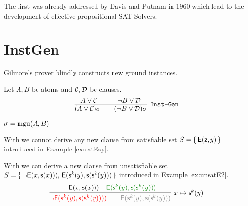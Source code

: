 The first was already addressed by Davis and Putnam in 1960 \cite{Davis:1960:CPQ:321033.321034}
which lead to the development of effective propositional SAT Solvers.

\section{InstGen}

Gilmore's prover blindly constructs new ground instances. 

\begin{definition}[\InstGen] Let $A, B$ be atoms and ${\mathcal C},{\mathcal D}$ be clauses.
	\begin{gather*}
	\infer
	[{\InstGen}] 
	{(A\lor\mathcal C)\sigma\qquad (\lnot B\lor\mathcal D)\sigma}
	{A\lor\mathcal C\quad&\quad \lnot B\lor\mathcal D}
	\end{gather*}
	\begin{center}$\sigma=\operatorname{mgu}(A,B)$
	\end{center}
\end{definition}

\begin{example}
	With \InstGen we cannot derive any new clause from satisfiable set 
	$S = \{\,{\mathsf{E}}({\mathsf z},y)\,\}$ 
	introduced in Example \ref{ex:satEzy}.
\end{example}

\begin{example}
	With \InstGen we can derive a new clause from unsatisfiable set
$S =
\{\,
{ \lnot{\mathsf{E}}(x, {\mathsf s}(x)))},\, 
{ {\mathsf{E}}({\mathsf s}^k(y), {\mathsf s}({\mathsf s}^k(y)))}
\,\}$ 
 introduced in Example \ref{ex:unsatE2}. 
\begin{gather*}
\infer[x\mapsto\msucc^k(y)]{
	{\colLo \lnot\mE(\ms^k(y), \ms(\ms^k(y))))} \qquad
	{\colG \mE(\ms^k(y), \ms(\ms^k(y)))}
}{
	{ \lnot\mE(x, \ms(x)))} &
	{\colHi \mE(\ms^k(y), \ms(\ms^k(y)))}
}
\end{gather*}
	
\end{example}

